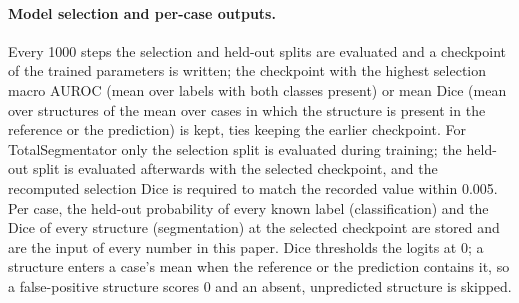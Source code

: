 \begin{table}[H]
\centering
\caption{Segmentation settings per method. All runs: AdamW, 8000 steps (24\,000 for the AMOS22 and TotalSegmentator joint models; two-stage methods split the budget in halves), four crops per step, warm-up 10\%, cosine to $10^{-6}$, bf16. LoRA-type adapters as in Table~\ref{tab:optim}.}
\label{tab:optimseg}
\end{table}

\paragraph{Model selection and per-case outputs.} Every 1000 steps the selection and held-out splits are evaluated and a checkpoint of the trained parameters is written; the checkpoint with the highest selection macro AUROC (mean over labels with both classes present) or mean Dice (mean over structures of the mean over cases in which the structure is present in the reference or the prediction) is kept, ties keeping the earlier checkpoint. For TotalSegmentator only the selection split is evaluated during training; the held-out split is evaluated afterwards with the selected checkpoint, and the recomputed selection Dice is required to match the recorded value within 0.005. Per case, the held-out probability of every known label (classification) and the Dice of every structure (segmentation) at the selected checkpoint are stored and are the input of every number in this paper. Dice thresholds the logits at 0; a structure enters a case's mean when the reference or the prediction contains it, so a false-positive structure scores 0 and an absent, unpredicted structure is skipped.

